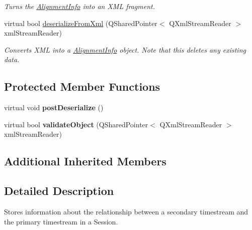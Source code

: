 \begin{DoxyCompactItemize}
\begin{DoxyCompactList}\small\item\em Turns the \hyperlink{class_picto_1_1_alignment_info}{Alignment\-Info} into an X\-M\-L fragment. \end{DoxyCompactList}\item 
\hypertarget{class_picto_1_1_alignment_info_a587ee5f5271f33fa9bdd2fe74214a99c}{virtual bool \hyperlink{class_picto_1_1_alignment_info_a587ee5f5271f33fa9bdd2fe74214a99c}{deserialize\-From\-Xml} (Q\-Shared\-Pointer$<$ Q\-Xml\-Stream\-Reader $>$ xml\-Stream\-Reader)}\label{class_picto_1_1_alignment_info_a587ee5f5271f33fa9bdd2fe74214a99c}

\begin{DoxyCompactList}\small\item\em Converts X\-M\-L into a \hyperlink{class_picto_1_1_alignment_info}{Alignment\-Info} object. Note that this deletes any existing data. \end{DoxyCompactList}\end{DoxyCompactItemize}
\subsection*{Protected Member Functions}
\begin{DoxyCompactItemize}
\item 
\hypertarget{class_picto_1_1_alignment_info_a198e972080faac66c0fa565a0fa2aa12}{virtual void {\bfseries post\-Deserialize} ()}\label{class_picto_1_1_alignment_info_a198e972080faac66c0fa565a0fa2aa12}

\item 
\hypertarget{class_picto_1_1_alignment_info_ab1ca4da31067c36a10c40adce1391740}{virtual bool {\bfseries validate\-Object} (Q\-Shared\-Pointer$<$ Q\-Xml\-Stream\-Reader $>$ xml\-Stream\-Reader)}\label{class_picto_1_1_alignment_info_ab1ca4da31067c36a10c40adce1391740}

\end{DoxyCompactItemize}
\subsection*{Additional Inherited Members}


\subsection{Detailed Description}
Stores information about the relationship between a secondary timestream and the primary timestream in a Session. 

